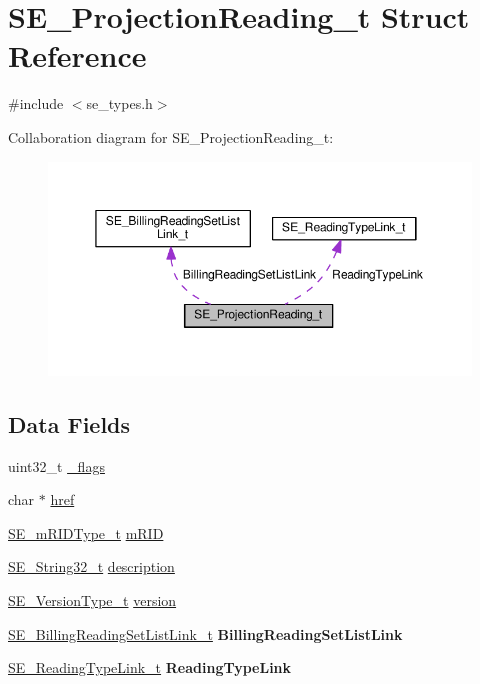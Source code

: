 \hypertarget{structSE__ProjectionReading__t}{}\section{S\+E\+\_\+\+Projection\+Reading\+\_\+t Struct Reference}
\label{structSE__ProjectionReading__t}


{\ttfamily \#include $<$se\+\_\+types.\+h$>$}



Collaboration diagram for S\+E\+\_\+\+Projection\+Reading\+\_\+t\+:\nopagebreak
\begin{figure}[H]
\begin{center}
\leavevmode
\includegraphics[width=350pt]{structSE__ProjectionReading__t__coll__graph}
\end{center}
\end{figure}
\subsection*{Data Fields}
\begin{DoxyCompactItemize}
\item 
uint32\+\_\+t \hyperlink{group__ProjectionReading_gaff70df5c83ad6c8c2861bea87128fbba}{\+\_\+flags}
\item 
char $\ast$ \hyperlink{group__ProjectionReading_ga2a1bf4a686ac027eb065f8a952f3f3c2}{href}
\item 
\hyperlink{group__mRIDType_gac74622112f3a388a2851b2289963ba5e}{S\+E\+\_\+m\+R\+I\+D\+Type\+\_\+t} \hyperlink{group__ProjectionReading_gacc942df214770665bc45618a06255c93}{m\+R\+ID}
\item 
\hyperlink{group__String32_gac9f59b06b168b4d2e0d45ed41699af42}{S\+E\+\_\+\+String32\+\_\+t} \hyperlink{group__ProjectionReading_ga51e901325d458cbd9963ef99e10fbefe}{description}
\item 
\hyperlink{group__VersionType_ga4b8d27838226948397ed99f67d46e2ae}{S\+E\+\_\+\+Version\+Type\+\_\+t} \hyperlink{group__ProjectionReading_ga5fdacfc135d427a7e68c07a75ad546d6}{version}
\item 
\hyperlink{structSE__BillingReadingSetListLink__t}{S\+E\+\_\+\+Billing\+Reading\+Set\+List\+Link\+\_\+t} {\bfseries Billing\+Reading\+Set\+List\+Link}
\item 
\hyperlink{structSE__ReadingTypeLink__t}{S\+E\+\_\+\+Reading\+Type\+Link\+\_\+t} {\bfseries Reading\+Type\+Link}
\end{DoxyCompactItemize}


